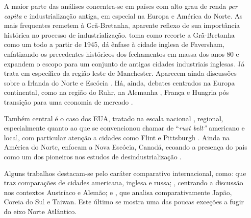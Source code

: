 A maior parte das análises concentra-se em países com alto grau de
renda \emph{per capita} e industrialização antiga, em especial na Europa
e América do Norte. As mais frequentes remetem à Grã-Bretanha, aparente
reflexo de sua importância histórica no processo de industrialização.
\citet{tomlinson_-industrialization_2016}
toma como recorte a Grã-Bretanha como um todo a partir de 1945,
\citet{nettleingham_beyond_2019}
dá ênfase à cidade inglesa de Faversham, enfatizando os precedentes
históricos dos fechamentos em massa dos anos 80 e \citet{beatty_long_2020} expandem o
escopo para um conjunto de antigas cidades industriais inglesas. Já
\citet{lewis_regenerating_2016}
trata em específico da região leste de Manchester. Aparecem ainda
discussões sobre a Irlanda do Norte
\citep{hodson_titanic_2019} e
Escócia \citep{perchard_broken_2013,phillips_deindustrialization_2013,phillips_closure_2015,phillips_deindustrialization_2019}.
Há, ainda, debates centrados na Europa continental, como na região do
Ruhr, na Alemanha
\citep{berger_burdens_2017}, França
\citep{clarke_closing_2015} e
Hungria pós transição para uma economia de mercado
\citep{scheiring_left_2020,scheiring_deindustrialization_2023}.

Também central é o caso dos EUA, tratado na escala nacional
\citep{berger_industrial_2022,kollmeyer_trade_2018}, regional, especialmente quanto ao que se
convencionou chamar de ``\emph{rust belt''} americano
\citep{bluestone_deindustrialization_1982,high_industrial_2003} e local, com particular atenção a cidades como
Flint \citep{highsmith_beyond_2014} e Pittsburgh
\citep{winant_hard_2019}.
Ainda na América do Norte, \citet{clark_voices_2020} enfocam a
Nova Escócia, Canadá, ecoando a presença do país como um dos pioneiros
nos estudos de desindustrialização
\citep[p.~994]{high_wounds_2013}.

Alguns trabalhos destacam-se pelo caráter comparativo internacional,
como: \citet{mah_industrial_2012}
que traz comparações de cidades americana, inglesa e russa; \citet{durazzi_social_2020},
centrando a discussão nos contextos Austríaco e Alemão; e \citet{lee_institutional_2016}, que
analisa comparativamente Japão, Coreia do Sul e Taiwan. Este último se
mostra uma das poucas exceções a fugir do eixo Norte Atlântico.

